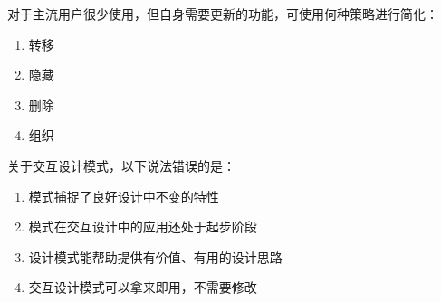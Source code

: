 \begin{problem}
	‍对于主流用户很少使用，但自身需要更新的功能，可使用何种策略进行简化：
    \vspace{-0.8em}
    \begin{multicols}{4}
        \begin{enumerate}[label=\Alph*.]
            \item 转移
            \item 隐藏
            \item 删除
            \item 组织
        \end{enumerate}
    \end{multicols}
    \vspace{-1em}
\end{problem}



\begin{problem}
	‍关于交互设计模式，以下说法错误的是： 
    \vspace{-0.8em}
    \begin{multicols}{2}
        \begin{enumerate}[label=\Alph*.]
            \item 模式捕捉了良好设计中不变的特性
            \item 模式在交互设计中的应用还处于起步阶段
            \item 设计模式能帮助提供有价值、有用的设计思路
            \item 交互设计模式可以拿来即用，不需要修改
        \end{enumerate}
    \end{multicols}
    \vspace{-1em}
\end{problem}
